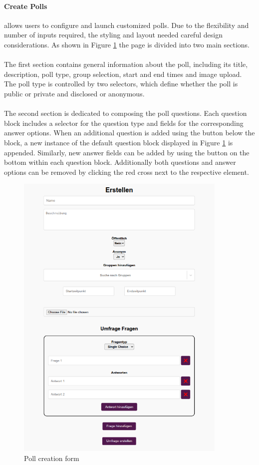 \documentclass[a4paper,12pt]{report}
\begin{document}
\paragraph{Create Polls} allows users to configure and launch customized polls. Due to the flexibility and number of inputs required, the styling and layout needed careful design considerations. As shown in Figure \ref{fig:create_view} the page is divided into two main sections. \\\\
The first section contains general information about the poll, including its title, description, poll type, group selection, start and end times and image upload. The poll type is controlled by two selectors, which define whether the poll is public or private and disclosed or anonymous. \\\\ 
The second section is dedicated to composing the poll questions. Each question block includes a selector for the question type and fields for the corresponding answer options. When an additional question is added using the button below the block, a new instance of the default question block displayed in Figure \ref{fig:create_view} is appended. Similarly, new answer fields can be added by using the button on the bottom within each question block. Additionally both questions and answer options can be removed by clicking the red cross next to the respective element.
\begin{figure}[H]
	\centering
	\includegraphics[width=0.9\textwidth]{pics/create_view.png}
	\caption{Poll creation form}
	\label{fig:create_view}
\end{figure}
\end{document}
